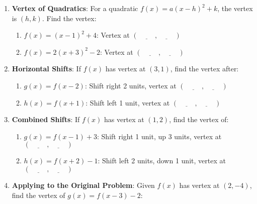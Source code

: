 \documentclass[12pt]{article}
\begin{document}
\begin{enumerate}[label=4.\arabic*]
    \item \textbf{Vertex of Quadratics}: For a quadratic \( f(x) = a(x - h)^2 + k \), the vertex is \( (h, k) \). Find the vertex:
    \begin{enumerate}[label=\alph*)]
        \item \( f(x) = (x - 1)^2 + 4 \): Vertex at \( (\underline{\hspace{1cm}}, \underline{\hspace{1cm}}) \)
        \item \( f(x) = 2(x + 3)^2 - 2 \): Vertex at \( (\underline{\hspace{1cm}}, \underline{\hspace{1cm}}) \)
    \end{enumerate}
    \item \textbf{Horizontal Shifts}: If \( f(x) \) has vertex at \( (3, 1) \), find the vertex after:
    \begin{enumerate}[label=\alph*)]
        \item \( g(x) = f(x - 2) \): Shift right 2 units, vertex at \( (\underline{\hspace{1cm}}, \underline{\hspace{1cm}}) \)
        \item \( h(x) = f(x + 1) \): Shift left 1 unit, vertex at \( (\underline{\hspace{1cm}}, \underline{\hspace{1cm}}) \)
    \end{enumerate}
    \item \textbf{Combined Shifts}: If \( f(x) \) has vertex at \( (1, 2) \), find the vertex of:
    \begin{enumerate}[label=\alph*)]
        \item \( g(x) = f(x - 1) + 3 \): Shift right 1 unit, up 3 units, vertex at \( (\underline{\hspace{1cm}}, \underline{\hspace{1cm}}) \)
        \item \( h(x) = f(x + 2) - 1 \): Shift left 2 units, down 1 unit, vertex at \( (\underline{\hspace{1cm}}, \underline{\hspace{1cm}}) \)
    \end{enumerate}
    \item \textbf{Applying to the Original Problem}: Given \( f(x) \) has vertex at \( (2, -4) \), find the vertex of \( g(x) = f(x - 3) - 2 \):

\end{enumerate}
\end{document}
